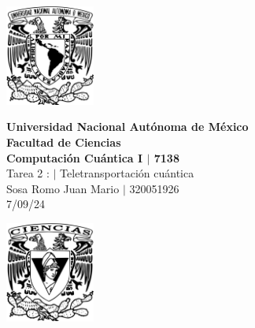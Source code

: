 \begin{center}
    \begin{minipage}{3cm}
    	\begin{center}
    		\includegraphics[height=3.3cm]{src/Img/Logo_UNAM.png}
    	\end{center}
    \end{minipage}\hfill
    \begin{minipage}{10cm}
    	\begin{center}
    	\textbf{\large Universidad Nacional Autónoma de México}\\[0.1cm]
        \textbf{Facultad de Ciencias}\\[0.1cm]
        \textbf{Computación Cuántica I $|$ 7138}\\[0.1cm]
        Tarea 2 : $|$ Teletransportación cuántica \\[0.1cm]
        Sosa Romo Juan Mario $|$ 320051926 \\[0.1cm]
        7/09/24
    	\end{center}
    \end{minipage}\hfill
    \begin{minipage}{3cm}
    	\begin{center}
    		\includegraphics[height=3.3cm]{src/Img/Logo_FC.png}
    	\end{center}
    \end{minipage}
\end{center}

